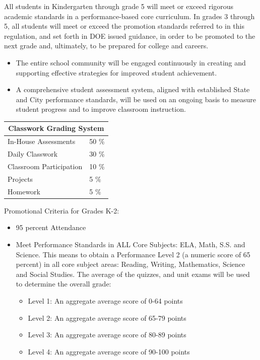 \documentclass[12pt,letterpaper]{article}
\begin{document}
All students in Kindergarten through grade 5 will meet or exceed rigorous academic standards in a performance-based core curriculum. In grades 3 through 5, all students will meet or exceed the promotion standards referred to in this regulation, and set forth in DOE issued guidance, in order to be promoted to the next grade and, ultimately, to be prepared for college and careers.
\begin{itemize}
\item The entire school community will be engaged continuously in creating and supporting effective strategies for improved student achievement.
\item A comprehensive student assessment system, aligned with established State and City performance standards, will be used on an ongoing basis to measure student progress and to improve classroom
instruction.
\end{itemize}
\begin{table}[h]
\begin{center}
\begin{tabular}{@{}|l|l|@{}}
\toprule
\multicolumn{2}{|c|}{\textbf{Classwork Grading System}} \\ \midrule
In-House Assessments             	& 50 \%          \\ \midrule
Daily Classwork            & 30 \%          \\ \midrule
Classroom Participation           & 10 \%          \\ \midrule
Projects                          & 5 \%           \\ \midrule
Homework                             & 5 \%           \\ \bottomrule
\end{tabular}
\end{center}
\end{table}
\pagebreak
\vspace*{1.5cm}
Promotional Criteria for Grades K-2:
\begin{itemize}
\item 95 percent Attendance
\item Meet Performance Standards in ALL Core Subjects: ELA, Math, S.S. and Science. This means to
obtain a Performance Level 2 (a numeric score of 65 percent) in all core subject areas: Reading,
Writing, Mathematics, Science and Social Studies. The average of the quizzes, and unit exams will
be used to determine the overall grade:
	\begin{itemize}
	\item Level 1: An aggregate average score of 0-64 points
	\item Level 2: An aggregate average score of 65-79 points
	\item Level 3: An aggregate average score of 80-89 points
	\item Level 4: An aggregate average score of 90-100 points
	\end{itemize}
\end{itemize}	
\end{document}
